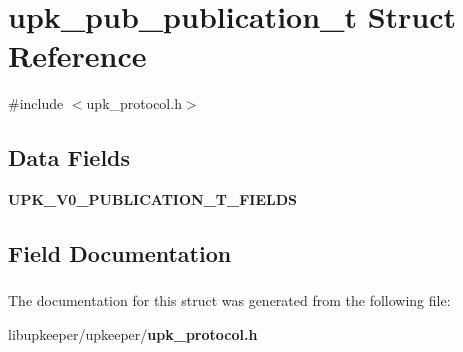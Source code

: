 \section{upk\_\-pub\_\-publication\_\-t Struct Reference}
\label{structupk__pub__publication__t}


{\ttfamily \#include $<$upk\_\-protocol.h$>$}

\subsection*{Data Fields}
\begin{DoxyCompactItemize}
\item 
{\bf UPK\_\-V0\_\-PUBLICATION\_\-T\_\-FIELDS}
\end{DoxyCompactItemize}


\subsection{Field Documentation}
\subsubsection[{UPK\_\-V0\_\-PUBLICATION\_\-T\_\-FIELDS}]{}\label{structupk__pub__publication__t_ae9bc317f7b9728751b7f71e84c9ee9cc}


The documentation for this struct was generated from the following file:\begin{DoxyCompactItemize}
\item 
libupkeeper/upkeeper/{\bf upk\_\-protocol.h}\end{DoxyCompactItemize}
